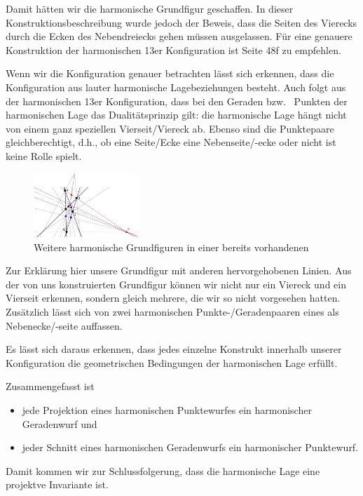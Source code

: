 \documentclass[12pt,a4paper]{article}
\begin{document}
Damit hätten wir die harmonische Grundfigur geschaffen. In dieser Konstruktionsbeschreibung wurde jedoch der Beweis, dass die Seiten des Vierecks durch die Ecken des Nebendreiecks gehen müssen ausgelassen. Für eine genauere Konstruktion der harmonischen 13er Konfiguration ist \citep{projektiveGeometrie} Seite 48f zu empfehlen.

Wenn wir die Konfiguration genauer betrachten lässt sich erkennen, dass die Konfiguration aus lauter harmonische Lagebeziehungen besteht. Auch folgt aus der harmonischen 13er Konfiguration, dass bei den Geraden bzw.~ Punkten der harmonischen Lage das Dualitätsprinzip gilt: die harmonische Lage hängt nicht von einem ganz speziellen Vierseit/Viereck ab. Ebenso sind die Punktepaare gleichberechtigt, d.h., ob eine Seite/Ecke eine Nebenseite/-ecke oder nicht ist keine Rolle spielt.

\begin{figure}
\centering
\includegraphics[width=0.35\textwidth]{Bilder/13_neu.png}
\caption{Weitere harmonische Grundfiguren in einer bereits vorhandenen}
\label{fig:13Neu}
\end{figure}

Zur Erklärung hier unsere Grundfigur mit anderen hervorgehobenen Linien. Aus der von uns konstruierten Grundfigur können wir nicht nur ein Viereck und ein Vierseit erkennen, sondern gleich mehrere, die wir so nicht vorgesehen hatten. Zusätzlich lässt sich von zwei harmonischen Punkte-/Geradenpaaren eines als Nebenecke/-seite auffassen.

Es lässt sich daraus erkennen, dass jedes einzelne Konstrukt innerhalb unserer Konfiguration die geometrischen Bedingungen der harmonischen Lage erfüllt.

Zusammengefasst ist

\begin{itemize}
\item jede Projektion eines harmonischen Punktewurfes ein harmonischer Geradenwurf und
\item jeder Schnitt eines harmonischen Geradenwurfs ein harmonischer Punktewurf.
\end{itemize}

Damit kommen wir zur Schlussfolgerung, dass die harmonische Lage eine projektve Invariante ist.
\end{document}
